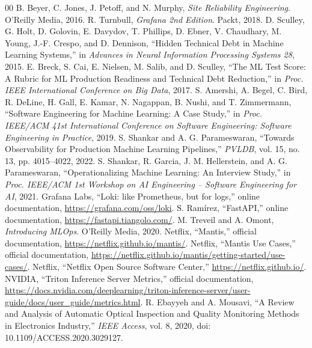 \documentclass[12pt,a4paper]{article}
\begin{document}
\renewcommand{\refname}{REFERENCES}
\begin{thebibliography}{00}
 B. Beyer, C. Jones, J. Petoff, and N. Murphy, \textit{Site Reliability Engineering}. O'Reilly Media, 2016.
 R. Turnbull, \textit{Grafana 2nd Edition}. Packt, 2018.
 D. Sculley, G. Holt, D. Golovin, E. Davydov, T. Phillips, D. Ebner, V. Chaudhary, M. Young, J.-F. Crespo, and D. Dennison, ``Hidden Technical Debt in Machine Learning Systems,'' in \textit{Advances in Neural Information Processing Systems 28}, 2015.
 E. Breck, S. Cai, E. Nielsen, M. Salib, and D. Sculley, ``The ML Test Score: A Rubric for ML Production Readiness and Technical Debt Reduction,'' in \textit{Proc. IEEE International Conference on Big Data}, 2017.
 S. Amershi, A. Begel, C. Bird, R. DeLine, H. Gall, E. Kamar, N. Nagappan, B. Nushi, and T. Zimmermann, ``Software Engineering for Machine Learning: A Case Study,'' in \textit{Proc. IEEE/ACM 41st International Conference on Software Engineering: Software Engineering in Practice}, 2019.
 S. Shankar and A. G. Parameswaran, ``Towards Observability for Production Machine Learning Pipelines,'' \textit{PVLDB}, vol. 15, no. 13, pp. 4015--4022, 2022.
 S. Shankar, R. Garcia, J. M. Hellerstein, and A. G. Parameswaran, ``Operationalizing Machine Learning: An Interview Study,'' in \textit{Proc. IEEE/ACM 1st Workshop on AI Engineering -- Software Engineering for AI}, 2021.
 Grafana Labs, ``Loki: like Prometheus, but for logs,'' online documentation, \url{https://grafana.com/oss/loki}.
 S. Ram\'irez, ``FastAPI,'' online documentation, \url{https://fastapi.tiangolo.com/}.
 M. Treveil and A. Omont, \textit{Introducing MLOps}. O'Reilly Media, 2020.
 Netflix, ``Mantis,'' official documentation, \url{https://netflix.github.io/mantis/}.
 Netflix, ``Mantis Use Cases,'' official documentation, \url{https://netflix.github.io/mantis/getting-started/use-cases/}.
 Netflix, ``Netflix Open Source Software Center,'' \url{https://netflix.github.io/}.
 NVIDIA, ``Triton Inference Server Metrics,'' official documentation, \url{https://docs.nvidia.com/deeplearning/triton-inference-server/user-guide/docs/user_guide/metrics.html}.
 R. Ebayyeh and A. Mousavi, ``A Review and Analysis of Automatic Optical Inspection and Quality Monitoring Methods in Electronics Industry,'' \textit{IEEE Access}, vol. 8, 2020, doi: 10.1109/ACCESS.2020.3029127.

\end{thebibliography}
\end{document}
